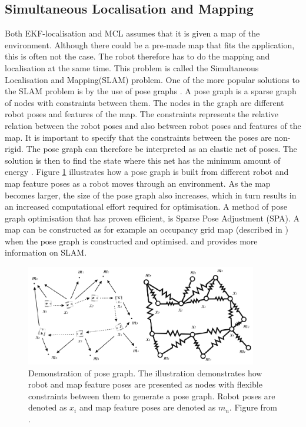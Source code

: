 \subsection{Simultaneous Localisation and Mapping}
Both EKF-localisation and MCL assumes that it is given a map of the environment. Although there could be a pre-made map that fits the application, this is often not the case. The robot therefore has to do the mapping and localisation at the same time. This problem is called the Simultaneous Localisation and Mapping(SLAM) problem. One of the more popular solutions to the SLAM problem is by the use of pose graphs \cite{Konolige2010}. A pose graph is a sparse graph of nodes with constraints between them. The nodes in the graph are different robot poses and features of the map. The constraints represents the relative relation between the robot poses and also between robot poses and features of the map. It is important to specify that the constraints between the poses are non-rigid. The pose graph can therefore be interpreted as an elastic net of poses. The solution is then to find the state where this net has the minimum amount of energy \cite{SiegwartRoland2011Itam}. Figure \ref{fig:poseGraph} illustrates how a pose graph is built from different robot and map feature poses as a robot moves through an environment. As the map becomes larger, the size of the pose graph also increases, which in turn results in an increased computational effort required for optimisation. A method of pose graph optimisation that has proven efficient, is Sparse Pose Adjustment (SPA)\cite{Konolige2010}. A  map can be constructed as for example an occupancy grid map (described in \cite{ThrunSebastian2005Pr}) when the pose graph is constructed and optimised. \cite{SiegwartRoland2011Itam} and \cite{ThrunSebastian2005Pr} provides more information on SLAM.

\begin{figure}[htp]
  \centering
  \includegraphics[width = 0.9\textwidth]{Figures/figposeGraph.pdf}
  \caption{Demonstration of pose graph. The illustration demonstrates how robot and map feature poses are presented as nodes with flexible constraints between them to generate a pose graph. Robot poses are denoted as $x_i$ and map feature poses are denoted as $m_n$. Figure from \cite{SiegwartRoland2011Itam}.}
  \label{fig:poseGraph}
\end{figure}


